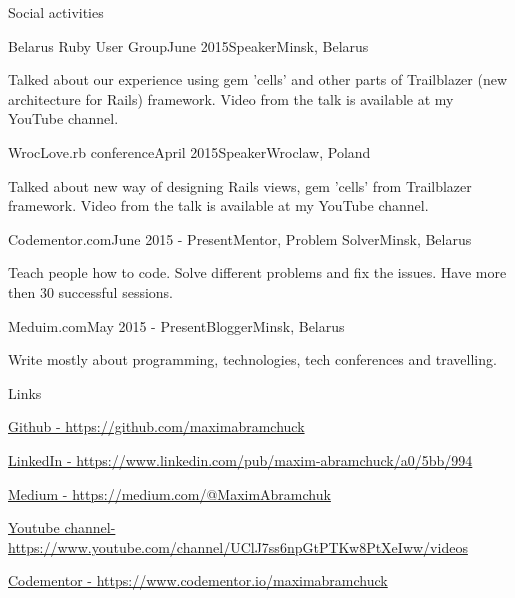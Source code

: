 \documentclass{resume} %
\begin{document}

\begin{rSection}{Social activities}

\begin{rSubsection}{Belarus Ruby User Group}{June 2015}{Speaker}{Minsk, Belarus}
  \item	Talked about our experience using gem 'cells' and other parts of Trailblazer (new architecture for Rails) framework. Video from the talk is available at my YouTube channel.
\end{rSubsection}

\begin{rSubsection}{WrocLove.rb conference}{April 2015}{Speaker}{Wroclaw, Poland}
  \item	Talked about new way of designing Rails views, gem 'cells' from Trailblazer framework. Video from the talk is available at my YouTube channel.
\end{rSubsection}

\begin{rSubsection}{Codementor.com}{June 2015 - Present}{Mentor, Problem Solver}{Minsk, Belarus}
  \item	Teach people how to code. Solve different problems and fix the issues. Have more then 30 successful sessions.
\end{rSubsection}

\begin{rSubsection}{Meduim.com}{May 2015 - Present}{Blogger}{Minsk, Belarus}
  \item	Write mostly about programming, technologies, tech conferences and travelling.
\end{rSubsection}

\end{rSection}


\begin{rSection}{Links}

\item \href{https://github.com/maximabramchuck}{Github - https://github.com/maximabramchuck}
\item \href{https://www.linkedin.com/pub/maxim-abramchuck/a0/5bb/994}{LinkedIn - https://www.linkedin.com/pub/maxim-abramchuck/a0/5bb/994}
\item \href{https://medium.com/@MaximAbramchuk}{Medium - https://medium.com/@MaximAbramchuk}
\item \href{https://www.youtube.com/channel/UClJ7ss6npGtPTKw8PtXeIww/videos}{Youtube channel- https://www.youtube.com/channel/UClJ7ss6npGtPTKw8PtXeIww/videos}
\item \href{https://www.codementor.io/maximabramchuck}{Codementor - https://www.codementor.io/maximabramchuck}


\end{rSection}

\end{document}
